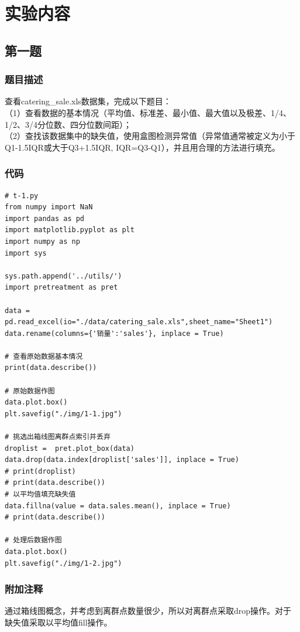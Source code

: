 \documentclass{article}
\begin{document}
\section{实验内容}
    \subsection{第一题}
        \subsubsection{题目描述}
            查看catering\_sale.xls数据集，完成以下题目：\\
            （1）查看数据的基本情况（平均值、标准差、最小值、最大值以及极差、1/4、1/2、3/4分位数、四分位数间距）；\\
            （2）查找该数据集中的缺失值，使用盒图检测异常值（异常值通常被定义为小于Q1-1.5IQR或大于Q3+1.5IQR, IQR=Q3-Q1），并且用合理的方法进行填充。\\
        \subsubsection{代码}
            \begin{lstlisting}
# t-1.py
from numpy import NaN
import pandas as pd
import matplotlib.pyplot as plt
import numpy as np
import sys

sys.path.append('../utils/')
import pretreatment as pret

data = pd.read_excel(io="./data/catering_sale.xls",sheet_name="Sheet1")
data.rename(columns={'销量':'sales'}, inplace = True)

# 查看原始数据基本情况
print(data.describe())

# 原始数据作图
data.plot.box()
plt.savefig("./img/1-1.jpg")

# 挑选出箱线图离群点索引并丢弃
droplist =  pret.plot_box(data)
data.drop(data.index[droplist['sales']], inplace = True)
# print(droplist)
# print(data.describe())
# 以平均值填充缺失值
data.fillna(value = data.sales.mean(), inplace = True)
# print(data.describe())

# 处理后数据作图
data.plot.box()
plt.savefig("./img/1-2.jpg")
            \end{lstlisting}
        \subsubsection{附加注释}
            通过箱线图概念，并考虑到离群点数量很少，所以对离群点采取drop操作。对于缺失值采取以平均值fill操作。
\end{document}

